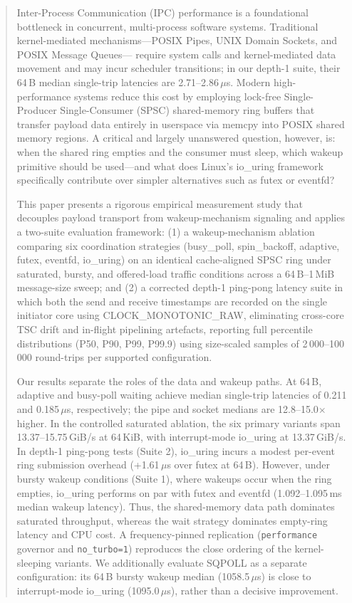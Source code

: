 \documentclass[10pt,conference]{IEEEtran}
\begin{document}
\begin{abstract}
Inter-Process Communication (IPC) performance is a foundational bottleneck in
concurrent, multi-process software systems. Traditional kernel-mediated
mechanisms---POSIX Pipes, UNIX Domain Sockets, and POSIX Message Queues---
require system calls and kernel-mediated data movement and may incur scheduler
transitions; in our depth-1 suite, their 64\,B median single-trip latencies are
2.71--2.86\,$\mu$s. Modern high-performance systems reduce this cost by employing
lock-free Single-Producer Single-Consumer (SPSC) shared-memory ring buffers
that transfer payload data entirely in userspace via memcpy into POSIX
shared memory regions. A critical and largely unanswered question, however,
is: when the shared ring empties and the consumer must sleep, which
wakeup primitive should be used---and what does Linux's
io\_uring framework specifically contribute over simpler
alternatives such as futex or eventfd?

This paper presents a rigorous empirical measurement study that decouples
payload transport from wakeup-mechanism signaling and applies a two-suite
evaluation framework: (1) a wakeup-mechanism ablation comparing six
coordination strategies (busy\_poll, spin\_backoff,
adaptive, futex, eventfd, io\_uring) on an
identical cache-aligned SPSC ring under saturated, bursty, and offered-load traffic
conditions across a 64\,B--1\,MiB message-size sweep; and (2) a
corrected depth-1 ping-pong latency suite in which both the send and
receive timestamps are recorded on the single initiator core using
CLOCK\_MONOTONIC\_RAW, eliminating cross-core TSC drift and
in-flight pipelining artefacts, reporting full percentile distributions
(P50, P90, P99, P99.9) using size-scaled samples of 2\,000--100\,000
round-trips per supported configuration.

Our results separate the roles of the data and wakeup paths. At 64\,B,
adaptive and busy-poll waiting achieve median single-trip latencies of
0.211 and 0.185\,$\mu$s, respectively; the pipe and socket medians are
12.8--15.0$\times$ higher. In the controlled saturated ablation, the six
primary variants span 13.37--15.75\,GiB/s at 64\,KiB, with interrupt-mode
io\_uring at 13.37\,GiB/s.
In depth-1 ping-pong tests (Suite 2), io\_uring incurs a modest per-event
ring submission overhead (+1.61\,$\mu$s over futex at 64\,B).
However, under bursty wakeup conditions (Suite 1), where wakeups occur when the
ring empties, io\_uring performs on par with futex and
eventfd (1.092--1.095\,ms median wakeup latency).
Thus, the shared-memory data path dominates saturated throughput, whereas the
wait strategy dominates empty-ring latency and CPU cost. A frequency-pinned
replication (\texttt{performance} governor and
\texttt{no\_turbo=1}) reproduces the close ordering of the kernel-sleeping
variants.  We additionally evaluate SQPOLL as a separate configuration:
its 64\,B bursty wakeup median (1058.5\,$\mu$s) is close to interrupt-mode
io\_uring (1095.0\,$\mu$s), rather than a decisive improvement.
\end{abstract}
\end{document}
